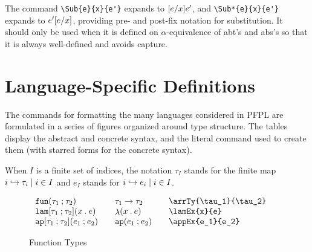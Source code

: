 \documentclass[11pt]{article}
\begin{document}
The command \verb|\Sub{e}{x}{e'}| expands to $\Sub{e}{x}{e'}$, and \verb|\Sub*{e}{x}{e'}| expands to $\Sub*{e}{x}{e'}$, providing pre- and post-fix notation for substitution.  It should only be used when it is defined on $\alpha$-equivalence of abt's and abs's so that it is always well-defined and avoids capture.

\section*{Language-Specific Definitions}

The commands for formatting the many languages considered in \textsf{PFPL} are formulated in a series of figures organized around type structure.  The tables display the abstract and concrete syntax, and the literal command used to create them (with starred forms for the concrete syntax).

When $I$ is a finite set of indices, the notation $\tau_I$ stands for the finite map $\finmap{I}{i}{\tau}$ and $e_I$ stands for $\finmap{I}{i}{e}$.

\clearpage
{}

\begin{figure}
  \begin{small}
    \begin{displaymath}
      \begin{array}{l@{\qquad}l@{\qquad}l@{\qquad}l}
        \arrTy{\tau_1}{\tau_2} & \arrTy*{\tau_1}{\tau_2} & \verb|\arrTy{\tau_1}{\tau_2}| \\
        \lamEx{x}{e}           & \lamEx*{x}{e}           & \verb|\lamEx{x}{e}|           \\
        \appEx{e_1}{e_2}       & \appEx*{e_1}{e_2}       & \verb|\appEx{e_1}{e_2}|
      \end{array}
    \end{displaymath}
  \end{small}

  \caption{Function Types}
  \label{fig:function}
\end{figure}
\end{document}
